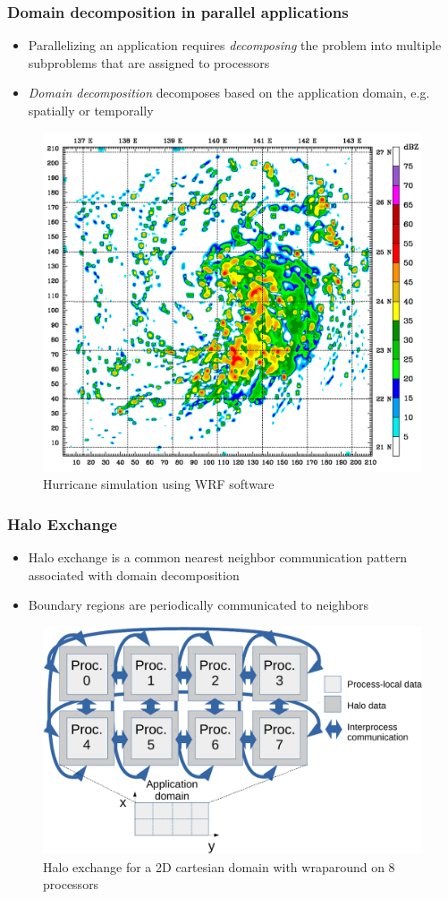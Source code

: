 \documentclass{beamer}
\begin{document}
\begin{frame}
\frametitle{Domain decomposition in parallel applications}
\begin{itemize}
  \item Parallelizing an application requires
      \emph{decomposing} the problem into multiple subproblems
      that are assigned to processors
  \item \emph{Domain decomposition} decomposes based on the application
          domain, e.g. spatially or temporally
\end{itemize}
\vspace{-1.0em}
\begin{figure}
  \centering
  \caption{Hurricane simulation using WRF software}
    \includegraphics[width=0.45\linewidth]{img/Typhoon_Mawar_2005_computer_simulation-frame24}

\end{figure}
\end{frame}

\begin{frame}
\frametitle{Halo Exchange}
\begin{itemize}
  \item Halo exchange is a common nearest neighbor communication pattern
        associated with domain decomposition
  \item Boundary regions are periodically communicated to neighbors
\end{itemize}
\begin{figure}
  \centering
  \caption{Halo exchange for a 2D cartesian domain with wraparound on 8 processors}
  \includegraphics[width=0.55\linewidth]{../fig/halo-illustration}
\end{figure}
\end{frame}
\end{document}
